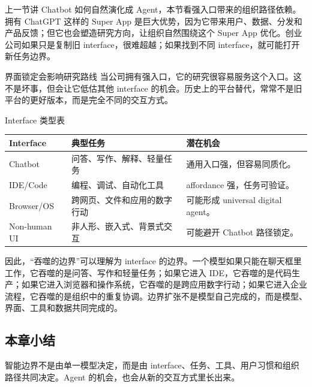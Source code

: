 上一节讲 Chatbot 如何自然演化成 Agent，本节看强入口带来的组织路径依赖。拥有 ChatGPT 这样的 Super App 是巨大优势，因为它带来用户、数据、分发和产品反馈；但它也会塑造研究方向，让组织自然围绕这个 Super App 优化。创业公司如果只是复制旧 interface，很难超越；如果找到不同 interface，就可能打开新任务边界。

\begin{warningbox}{界面锁定会影响研究路线}
当公司拥有强入口，它的研究很容易服务这个入口。这不是坏事，但会让它低估其他 interface 的机会。历史上的平台替代，常常不是旧平台的更好版本，而是完全不同的交互方式。
\end{warningbox}

\begin{knowledgebox}{Interface 类型表}
\begin{tabularx}{\textwidth}{p{}p{}X}
\toprule
Interface & 典型任务 & 潜在机会 \\
\midrule
Chatbot & 问答、写作、解释、轻量任务 & 通用入口强，但容易同质化。 \\
IDE/Code & 编程、调试、自动化工具 & affordance 强，任务可验证。 \\
Browser/OS & 跨网页、文件和应用的数字行动 & 可能形成 universal digital agent。 \\
Non-human UI & 非人形、嵌入式、背景式交互 & 可能避开 Chatbot 路径锁定。 \\
\bottomrule
\end{tabularx}
\end{knowledgebox}

因此，“吞噬的边界”可以理解为 interface 的边界。一个模型如果只能在聊天框里工作，它吞噬的是问答、写作和轻量任务；如果它进入 IDE，它吞噬的是代码生产；如果它进入浏览器和操作系统，它吞噬的是跨应用数字行动；如果它进入企业流程，它吞噬的是组织中的重复协调。边界扩张不是模型自己完成的，而是模型、界面、工具和数据共同完成的。

\subsection{本章小结}

智能边界不是由单一模型决定，而是由 interface、任务、工具、用户习惯和组织路径共同决定。Agent 的机会，也会从新的交互方式里长出来。


